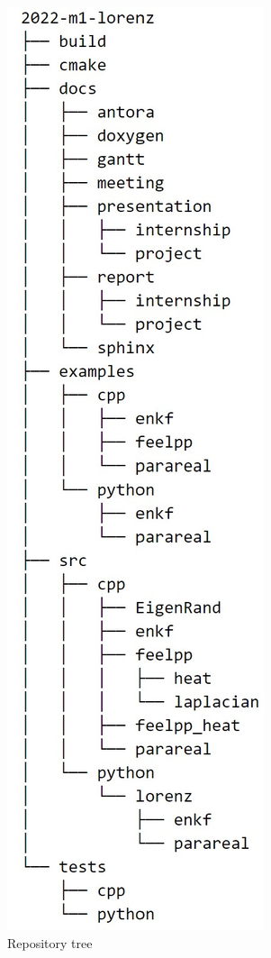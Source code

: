 	\begin{minipage}{0.33\linewidth}
		\begin{figure}[H]
			\includegraphics[width=\textwidth]{"images/appendix/tree.jpg"}
			\caption{Repository tree}
			\label{tree}
		\end{figure}
	\end{minipage}

